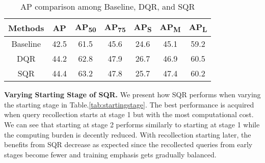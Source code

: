 \documentclass[10pt,twocolumn,letterpaper]{article}
\begin{document}
\begin{comment}
First, we investigate the effectiveness of DQR and SQR on Adamixer. The results are summarized in Table \ref{tab:baseline_vs_qr}. Both can improve the baseline performance. However, SQR cuts down nearly half of the loss calculation and memory consumption and still achieves better results. We observer similar performances on other model architectures. So for the rest of the ablation study, we follow SQR for its efficiency. 
\end{comment}


\begin{table}[]
    \centering
    \begin{tabular}{c|c|c|c|c|c|c}
    \toprule[1pt]
        Methods & AP   & AP\textsubscript{50}    & AP\textsubscript{75}  & AP\textsubscript{S}   & AP\textsubscript{M}   & AP\textsubscript{L}  \\ \midrule
        
    Baseline       & 42.5 & 61.5 & 45.6 & 24.6  & 45.1  & 59.2 \\
      DQR          & 44.2 & 62.8 & 47.9 & 26.7  & 46.9  & 60.5 \\
      SQR          & 44.4 & 63.2 & 47.8 & 25.7  & 47.4  & 60.2 \\
       \bottomrule
    \end{tabular}
    \caption{AP comparison among Baseline, DQR, and SQR}
    \label{tab:baseline_vs_qr}
\end{table}

\textbf{Varying Starting Stage of SQR.} We present how SQR performs when varying the starting stage in Table.\ref{tab:startingstage}. The best performance is acquired when query recollection starts at stage 1 but with the most computational cost. We can see that starting at stage 2 performs similarly to starting at stage 1 while the computing burden is decently reduced. With recollection starting later, the benefits from SQR decrease as expected since the recollected queries from early stages become fewer and training emphasis gets gradually balanced.
\end{document}
